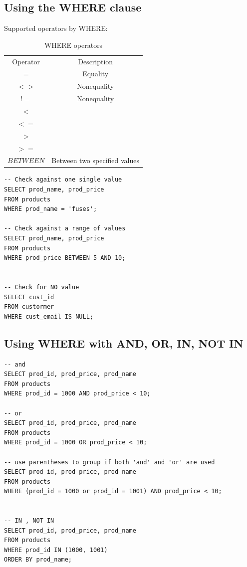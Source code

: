 \documentclass[12pt,oneside,a4paper]{article}
\begin{document}
\subsection{Using the \textsf{WHERE} clause}
Supported operators by \textsf{WHERE}:
\begin{table}
	\centering
	\begin{tabular}{ |c|c|} 
		\hline
		Operator & Description\\ 
		$=$ & Equality \\ 
		$<>$ & Nonequality \\ 
		$!=$ & Nonequality \\ 
		$<$ &  \\ 
		$<=$ &  \\ 
		$>$ &  \\ 
		$>=$ &  \\ 
		$BETWEEN$ & Between two specified values \\ 
		\hline
	\end{tabular}
    \caption{\textsf{WHERE} operators}
    \end{table}
\FloatBarrier


\begin{lstlisting}
-- Check against one single value 
SELECT prod_name, prod_price 
FROM products 
WHERE prod_name = 'fuses';

-- Check against a range of values 
SELECT prod_name, prod_price 
FROM products 
WHERE prod_price BETWEEN 5 AND 10;


-- Check for NO value
SELECT cust_id 
FROM custormer 
WHERE cust_email IS NULL;
\end{lstlisting}

\subsection{Using \textsf{WHERE} with \textsf{AND, OR, IN, NOT IN}}

\begin{lstlisting}
-- and 
SELECT prod_id, prod_price, prod_name
FROM products 
WHERE prod_id = 1000 AND prod_price < 10;

-- or
SELECT prod_id, prod_price, prod_name
FROM products 
WHERE prod_id = 1000 OR prod_price < 10;

-- use parentheses to group if both 'and' and 'or' are used 
SELECT prod_id, prod_price, prod_name
FROM products 
WHERE (prod_id = 1000 or prod_id = 1001) AND prod_price < 10;


-- IN , NOT IN 
SELECT prod_id, prod_price, prod_name
FROM products 
WHERE prod_id IN (1000, 1001)
ORDER BY prod_name;
\end{lstlisting}
\end{document}
